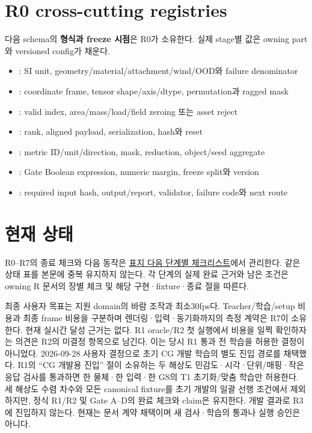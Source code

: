 \documentclass[10pt]{article}
\begin{document}
\section{R0 cross-cutting registries}

다음 schema의 \textbf{형식과 freeze 시점}은 R0가 소유한다. 실제 stage별 값은 owning part와
versioned config가 채운다.
\begin{itemize}
  \item {}: SI unit, geometry/material/attachment/wind/OOD와 failure denominator
  \item {}: coordinate frame, tensor shape/axis/dtype, permutation과 ragged mask
  \item {}: valid index, area/mass/load/field zeroing 또는 asset reject
  \item {}: rank, aligned payload, serialization, hash와 reset
  \item {}: metric ID/unit/direction, mask, reduction, object/seed aggregate
  \item {}: Gate Boolean expression, numeric margin, freeze split와 version
  \item {}: required input hash, output/report, validator, failure code와 next route
\end{itemize}

\section{현재 상태}

R0--R7의 종료 체크와 다음 동작은 \hyperref[sec:dev-checklist]{표지 다음 단계별 체크리스트}에서 관리한다.
같은 상태 표를 본문에 중복 유지하지 않는다. 각 단계의 실제 완료 근거와 남은 조건은 owning R 문서의
장별 체크 및 해당 구현·fixture·종료 절을 따른다.

최종 사용자 목표는 지원 domain의 바람 조작과 최소30fps다. Teacher/학습/setup 비용과 최종 frame 비용을
구분하며 렌더링·입력·동기화까지의 측정 계약은 R7이 소유한다. 현재 실시간 달성 근거는 없다.
R1 oracle/R2 첫 실행에서 비용을 일찍 확인하자는 의견은 R2의 미결정 항목으로 남긴다.
이는 당시 R1 통과 전 학습을 허용한 결정이 아니었다.
2026-09-28 사용자 결정으로 초기 CG 개발 학습의 별도 진입 경로를 채택했다.
R1의 ``CG 개발용 진입'' 절이 소유하는 두 해상도 민감도·시각·단위/매핑·작은 응답 검사를
통과하면 한 물체·한 입력·한 GS의 T1 초기화/맞춤 학습만 허용한다.
세 해상도 수렴 차수와 모든 canonical fixture를 초기 개발의 일괄 선행 조건에서 제외하지만,
정식 R1/R2 및 Gate A--D의 완료 체크와 claim은 유지한다. 개발 결과로 R3에 진입하지 않는다.
현재는 문서 계약 채택이며 새 검사·학습의 통과나 실행 승인은 아니다.
\end{document}
